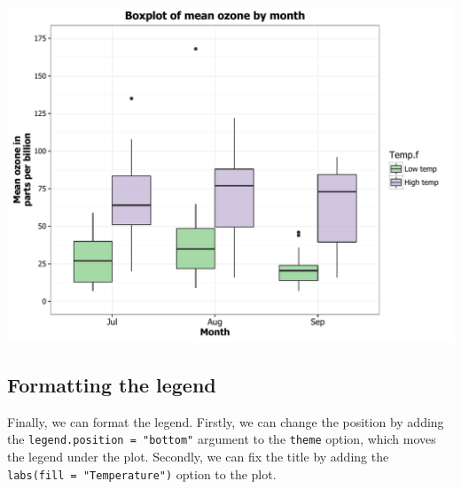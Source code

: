 \documentclass[]{article}
\begin{document}
\begin{center}\includegraphics{0_all_posts_pdf/box_17-1} \end{center}

\subsection{Formatting the legend}\label{formatting-the-legend-3}

Finally, we can format the legend. Firstly, we can change the position
by adding the \texttt{legend.position\ =\ "bottom"} argument to the
\texttt{theme} option, which moves the legend under the plot. Secondly,
we can fix the title by adding the \texttt{labs(fill\ =\ "Temperature")}
option to the plot.
\end{document}
